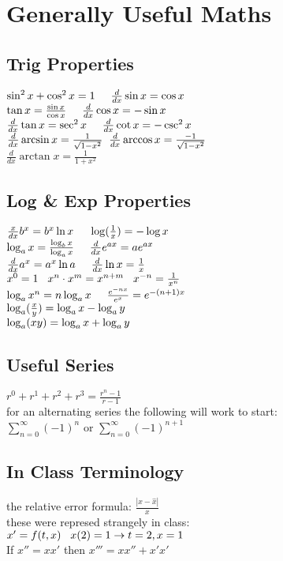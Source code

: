 \section{Generally Useful Maths}
\subsection*{Trig Properties}
$\sin^2x + \cos^2x = 1 \hspace{5mm} \frac{d}{dx}\sin x= \cos x$\\
$\tan x = \frac{\sin x}{\cos x} \hspace{5mm} \frac{d}{dx}\cos x= - \sin x$\\
$\frac{d}{dx}\tan x = \sec^2 x \hspace{5mm} \frac{d}{dx}\cot x = - \csc^2 x$\\
$\frac{d}{dx} \arcsin x = \frac{1}{\sqrt{1 - x^2}}  \hspace{2mm}   \frac{d}{dx} \arccos x = \frac{-1}{\sqrt{1 - x^2}}  $\\
$\frac{d}{dx} \arctan x = \frac{1}{1 + x^2}      $\\

\subsection*{Log \& Exp Properties}
$\frac{x}{dx} b^x = b^x \ln x \hspace{5mm} \log(\frac{1}{x}) = - \log x$\\
$\log_ax = \frac{\log_bx}{\log_ax} \hspace{5mm} \frac{d}{dx}e^{ax} = ae^{ax}$\\
$\frac{d}{dx}a^{x} = a^{x} \ln a \hspace{5mm} \frac{d}{dx} \ln x = \frac{1}{x} $\\
$x^0 = 1 \hspace{3mm} x^n \cdot x^m = x^{n+m} \hspace{3mm} x^{-n} = \frac{1}{x^n}    $\\
$\log_a x^n = n \log_a x \hspace{5mm} \frac{e^{-n x}}{e^x} = e^{-(n+1)x}    $\\
$\log_a (\frac{x}{y}) = \log_a x - \log_a y \hspace{2mm}  $\\
$\log_a (xy) = \log_a x + \log_a y \hspace{2mm}  $\\

\subsection*{Useful Series}
$r^0 + r^1 + r^2 + r^3 = \frac{r^n - 1}{r - 1}$\\
for an alternating series the following will work to start:\\
$ \sum_{n=0}^{\infty} (-1)^n $ or $ \sum_{n=0}^{\infty} (-1)^{n+1} $\\

\subsection*{In Class Terminology}
the relative error formula:
$ \frac{|x - \hat{x}|}{x} $\\
these were represed strangely in class:\\
$ x' = f(t,x)  \hspace{3mm} x(2) = 1 \rightarrow t = 2, x=1 $\\
If $x'' =  xx'$ then $x''' = xx'' + x'x'$
